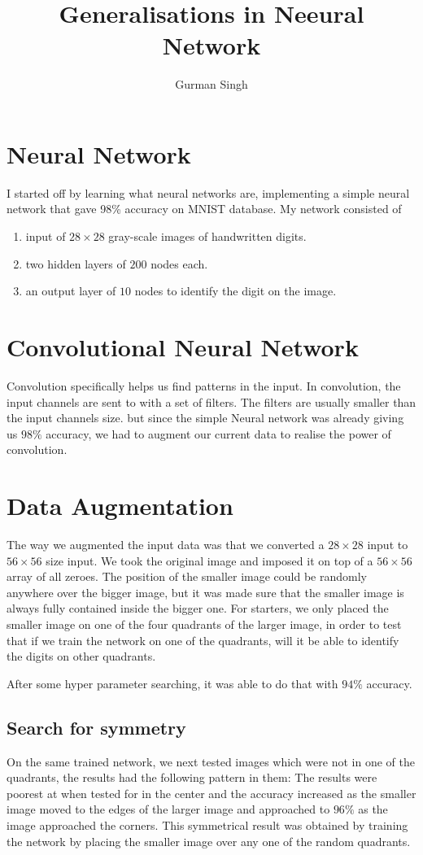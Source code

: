 \documentclass[12pt]{article}
\title{Generalisations in Neeural Network}
\author{Gurman Singh}
\begin{document}
\maketitle

\section{Neural Network}
I started off by learning what neural networks are, implementing a simple neural network that gave 98\% accuracy on MNIST database.
My network consisted of 
\begin{enumerate}
    \item input of $28 \times 28$ gray-scale images of handwritten digits.
    \item two hidden layers of $200$ nodes each.
    \item an output layer of $10$ nodes to identify the digit on the image.
\end{enumerate}
\section{Convolutional Neural Network}
Convolution specifically helps us find patterns in the input. In convolution, the input channels are sent to with a set of filters. The filters are usually smaller than the input channels size.
but since the simple Neural network was already giving us $98\%$ accuracy, we had to augment our current data to realise the power of convolution.
\section{Data Augmentation}
The  way we augmented the input data was that we converted a $28 \times 28$ input to $56 \times 56$ size input. We took the original image and imposed it on top of a $56 \times 56$ array of all zeroes. The position of the smaller image could be randomly anywhere over the bigger image, but it was made sure that the smaller image is always fully contained inside the bigger one.
For starters, we only placed the smaller image on one of the four quadrants of the larger image, in order to test that if we train the network on one of the quadrants, will it be able to identify the digits on other quadrants.

After some hyper parameter searching, it was able to do that with $94\%$ accuracy.
\subsection{Search for symmetry}
On the same trained network, we next tested images which were not in one of the quadrants, the results had the following pattern in them:
The results were poorest at when tested for in the center and the accuracy increased as the smaller image moved to the edges of the larger image and approached to $96\%$ as the image approached the corners.
This symmetrical result was obtained by training the network by placing the smaller image over any one of the random quadrants.
\end{document}
